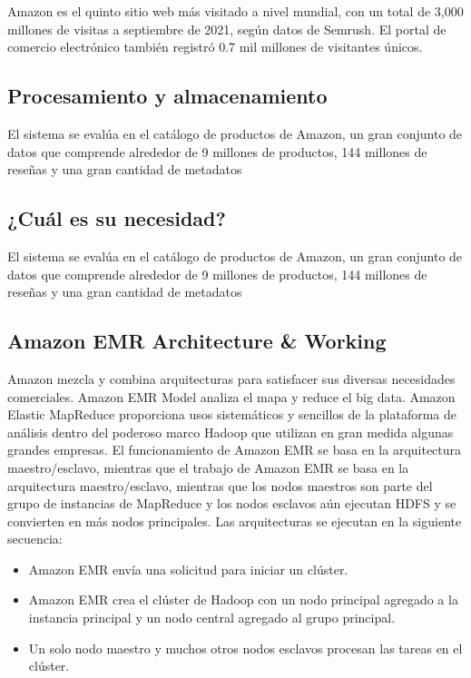 Amazon es el quinto sitio web más visitado a nivel mundial, con un total de 3,000 millones de visitas a septiembre de 2021, según datos de Semrush. El portal de comercio electrónico también registró 0.7 mil millones de visitantes únicos. 

\subsection{Procesamiento y almacenamiento}
El sistema se evalúa en el catálogo de productos de Amazon, un gran conjunto de datos que comprende alrededor de 9 millones de productos, 144 millones de reseñas y una gran cantidad de metadatos 

\subsection{¿Cuál es su necesidad?}

El sistema se evalúa en el catálogo de productos de Amazon, un gran conjunto de datos que comprende alrededor de 9 millones de productos, 144 millones de reseñas y una gran cantidad de metadatos 

\subsection{Amazon EMR Architecture \& Working}
Amazon mezcla y combina arquitecturas para satisfacer sus diversas necesidades comerciales. Amazon EMR Model analiza el mapa y reduce el big data. Amazon Elastic MapReduce proporciona usos sistemáticos y sencillos de la plataforma de análisis dentro del poderoso marco Hadoop que utilizan en gran medida algunas grandes empresas. El funcionamiento de Amazon EMR se basa en la arquitectura maestro/esclavo, mientras que el trabajo de Amazon EMR se basa en la arquitectura maestro/esclavo, mientras que los nodos maestros son parte del grupo de instancias de MapReduce y los nodos esclavos aún ejecutan HDFS y se convierten en más nodos principales. Las arquitecturas se ejecutan en la siguiente secuencia:
\begin{itemize}
	\item Amazon EMR envía una solicitud para iniciar un clúster.
	\item Amazon EMR crea el clúster de Hadoop con un nodo principal agregado a la instancia principal y un nodo central agregado al grupo principal.
	\item Un solo nodo maestro y muchos otros nodos esclavos procesan las tareas en el clúster.
\end{itemize}



